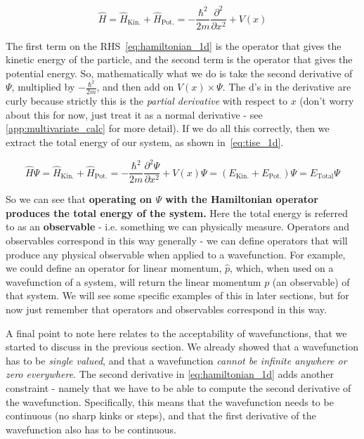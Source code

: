 \documentclass{memoir}[11pt,oneside,a4paper,openany]
\newcommand{\wf}{\ensuremath{\Psi}\xspace}
\begin{document}
\begin{equation}\label{eq:hamiltonian_1d}
	\hat{H} = \hat{H}_{\text{Kin.}} + \hat{H}_{\text{Pot.}} = -\frac{\hbar^2}{2m} \frac{\partial^2}{\partial x^2} + V(x)
\end{equation}

The first term on the RHS~\autoref{eq:hamiltonian_1d} is the operator that gives the kinetic energy of the particle, and the second term is the operator that gives the potential energy. So, mathematically what we do is take the second derivative of \wf, multiplied by $-\frac{\hbar^2}{2m}$, and then add on $V(x) \times \wf$. The d's in the derivative are curly because strictly this is the \emph{partial derivative} with respect to $x$ (don't worry about this for now, just treat it as a normal derivative - see \autoref{app:multivariate_calc} for more detail). If we do all this correctly, then we extract the total energy of our system, as shown in~\autoref{eq:tise_1d}.

\begin{equation}\label{eq:tise_1d}
	\hat{H}\wf = \hat{H}_{\text{Kin.}} + \hat{H}_{\text{Pot.}} = -\frac{\hbar^2}{2m} \frac{\partial^2\wf}{\partial x^2} + V(x)\wf = (E_{\text{Kin.}}+E_{\text{Pot.}})\wf = E_{\text{Total}} \wf
\end{equation}

So we can see that \textbf{operating on \wf with the Hamiltonian operator produces the total energy of the system.} Here the total energy is referred to as an \textbf{observable} - i.e. something we can physically measure. Operators and observables correspond in this way generally - we can define operators that will produce any physical observable when applied to a wavefunction. For example, we could define an operator for linear momentum, $\hat{p}$, which, when used on a wavefunction of a system, will return the linear momentum $p$ (an observable) of that system. We will see some specific examples of this in later sections, but for now just remember that operators and observables correspond in this way.  

A final point to note here relates to the acceptability of wavefunctions, that we started to discuss in the previous section. We already showed that a wavefunction has to be \emph{single valued}, and that a wavefunction \emph{cannot be infinite anywhere or zero everywhere}. The second derivative in \autoref{eq:hamiltonian_1d} adds another constraint - namely that we have to be able to compute the second derivative of the wavefunction. Specifically, this means that the wavefunction needs to be continuous (no sharp kinks or steps), and that the first derivative of the wavefunction also has to be continuous. 
\end{document}
